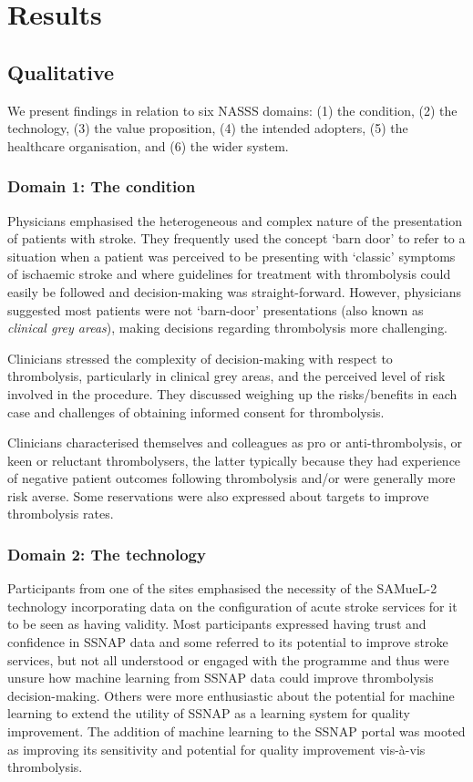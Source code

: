 \section{Results}

\subsection{Qualitative}

We present findings in relation to six NASSS domains: (1) the condition, (2) the technology, (3) the value proposition, (4) the intended adopters, (5) the healthcare organisation, and (6) the wider system.

\subsubsection{Domain 1: The condition}

Physicians emphasised the heterogeneous and complex nature of the presentation of patients with stroke. They frequently used the concept ‘barn door’ to refer to a situation when a patient was perceived to be presenting with ‘classic’ symptoms of ischaemic stroke and where guidelines for treatment with thrombolysis could easily be followed and decision-making was straight-forward. However, physicians suggested most patients were not ‘barn-door’ presentations (also known as \textit{clinical grey areas}), making decisions regarding thrombolysis more challenging.

Clinicians stressed the complexity of decision-making with respect to thrombolysis, particularly in clinical grey areas, and the perceived level of risk involved in the procedure. They discussed weighing up the risks/benefits in each case and challenges of obtaining informed consent for thrombolysis.

Clinicians characterised themselves and colleagues as pro or anti-thrombolysis, or keen or reluctant thrombolysers, the latter typically because they had experience of negative patient outcomes following thrombolysis and/or were generally more risk averse. Some reservations were also expressed about targets to improve thrombolysis rates.

\subsubsection{Domain 2: The technology}

Participants from one of the sites emphasised the necessity of the SAMueL-2 technology incorporating data on the configuration of acute stroke services for it to be seen as having validity. Most participants expressed having trust and confidence in SSNAP data and some referred to its potential to improve stroke services, but not all understood or engaged with the programme and thus were unsure how machine learning from SSNAP data could improve thrombolysis decision-making. Others were more enthusiastic about the potential for machine learning to extend the utility of SSNAP as a learning system for quality improvement. The addition of machine learning to the SSNAP portal was mooted as improving its sensitivity and potential for quality improvement vis-à-vis thrombolysis.

